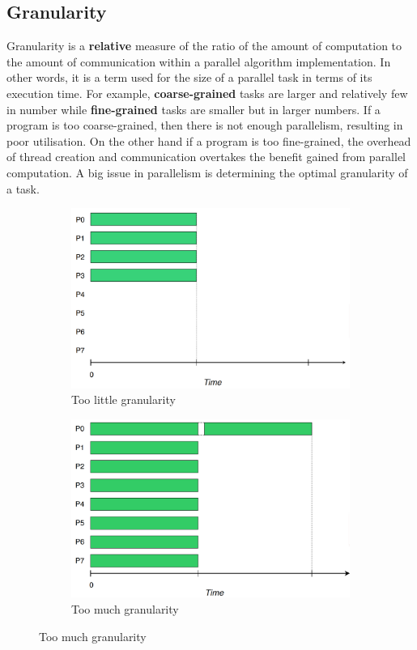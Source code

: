 \documentclass[CS4204-Notes.tex]{subfiles}
\begin{document}
\subsection{Granularity}
Granularity is a \textbf{relative} measure of the ratio of the amount of computation to the amount of communication within a parallel algorithm implementation. In other words, it is a term used for the size of a parallel task in terms of its execution time. 
\n
For example, \textbf{coarse-grained} tasks are larger and relatively few in number while \textbf{fine-grained} tasks are smaller but in larger numbers. If a program is too coarse-grained, then there is not enough parallelism, resulting in poor utilisation. On the other hand if a program is too fine-grained, the overhead of thread creation and communication overtakes the benefit gained from parallel computation. A big issue in parallelism is determining the optimal granularity of a task.
\begin{figure}[H]
\centering
\begin{subfigure}{0.47\textwidth}
\includegraphics[width=1\textwidth, keepaspectratio]{imgs/granularity-little.png}
\caption{Too little granularity}
\end{subfigure}
\hspace*{\fill}
\begin{subfigure}{0.47\textwidth}
\includegraphics[width=1\textwidth, keepaspectratio]{imgs/granularity-much.png}
\caption{Too much granularity}
\end{subfigure}
\end{figure}
\end{document}
